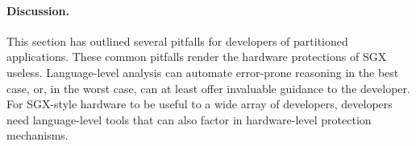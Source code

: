 



\paragraph{Discussion.}  This
section has outlined several pitfalls for developers of partitioned applications.
These common pitfalls render the hardware protections of SGX useless.
Language-level analysis can automate error-prone reasoning in the best case, or, in the worst case, 
can at least offer invaluable guidance to the developer.  For SGX-style
hardware to be useful to a wide array of developers, developers need language-level
tools that can also factor in hardware-level protection mechanisms.



